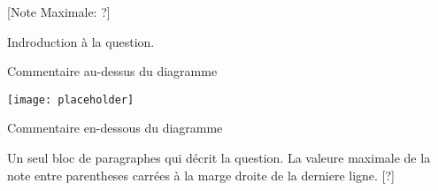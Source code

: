\begin{question}
  \hspace*{\fill} [Note Maximale: ?]\par
  \medskip
  \noindent Indroduction à la question.\par
  \medskip
  \begin{center} %
    \noindent Commentaire au-dessus du diagramme\par
    \texttt{[image: placeholder]}\par
    \noindent Commentaire en-dessous du diagramme\par
  \end{center} %

  \medskip
  \noindent Un seul bloc de paragraphes qui décrit la question.  La valeure maximale de la note entre parentheses carrées à la marge droite de la derniere ligne.\hspace*{\fill} [?]\par
  
\end{question}
